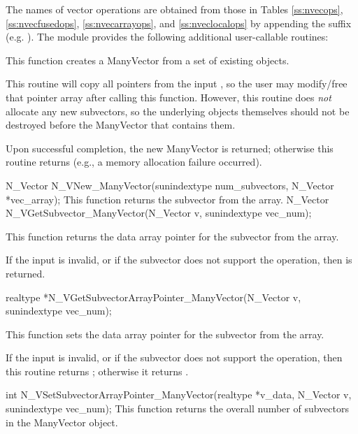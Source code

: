 The names of vector operations are obtained from those in Tables
\ref{ss:nvecops}, \ref{ss:nvecfusedops}, \ref{ss:nvecarrayops}, and
\ref{ss:nveclocalops} by appending the suffix  
(e.g. ).
The module {\nvecmanyvector} provides the following additional
user-callable routines:
{
  This function creates a ManyVector from a set of existing {\nvector}
  objects.

  This routine will copy all  pointers from the input
  , so the user may modify/free that pointer array
  after calling this function.  However, this routine does \emph{not}
  allocate any new subvectors, so the underlying {\nvector} objects
  themselves should not be destroyed before the ManyVector that
  contains them.

  Upon successful completion, the new ManyVector is returned;
  otherwise this routine returns  (e.g., a memory allocation
  failure occurred).
}
{
  N\_Vector N\_VNew\_ManyVector(sunindextype num\_subvectors,
  N\_Vector *vec\_array);
}
{
  This function returns the  subvector from the {\nvector}
  array.
}
{
  N\_Vector N\_VGetSubvector\_ManyVector(N\_Vector v, sunindextype vec\_num);
}
{
  This function returns the data array pointer for the 
  subvector from the {\nvector} array.

  If the input  is invalid, or if the subvector does not
  support the  operation, then  is returned.
}
{
  realtype *N\_VGetSubvectorArrayPointer\_ManyVector(N\_Vector v, sunindextype vec\_num);
}
{
  This function sets the data array pointer for the 
  subvector from the {\nvector} array.

  If the input  is invalid, or if the subvector does not
  support the  operation, then this routine
  returns ; otherwise it returns .
}
{
  int N\_VSetSubvectorArrayPointer\_ManyVector(realtype *v\_data, N\_Vector v, sunindextype vec\_num);
}
{
  This function returns the overall number of subvectors in the
  ManyVector object.
}
